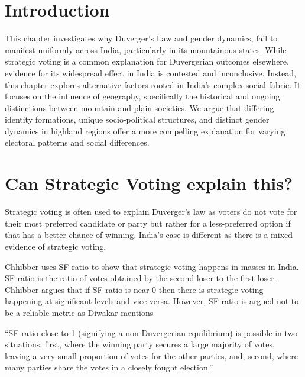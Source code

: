 \section{Introduction}

This chapter investigates why Duverger’s Law and gender dynamics, fail to manifest uniformly across India, particularly in its mountainous states. While strategic voting is a common explanation for Duvergerian outcomes elsewhere, evidence for its widespread effect in India is contested and inconclusive. Instead, this chapter explores alternative factors rooted in India’s complex social fabric. It focuses on the  influence of geography, specifically the historical and ongoing distinctions between mountain and plain societies. We argue that differing identity formations, unique socio-political structures, and distinct gender dynamics in highland regions offer a more compelling explanation for varying electoral patterns and social differences.


\section{Can Strategic Voting explain this?}

Strategic voting is often used to explain Duverger’s law as voters do not vote for their most preferred candidate or party but rather for a less-preferred option if that has a better chance of winning. India’s case is different as there is a mixed evidence of strategic voting. 

\vspace{0.3cm}

Chhibber uses SF ratio to show that strategic voting happens in masses in India. SF ratio is the ratio of votes obtained by the second loser to the first loser. Chhibber argues that if SF ratio is near 0 then there is strategic voting happening at significant levels and vice versa. However, SF ratio is argued not to be a reliable metric as Diwakar mentions 

\vspace{0.3cm}

“SF ratio close to 1 (signifying a non-Duvergerian equilibrium) is possible in two situations: first, where the winning party secures a large majority of votes, leaving a very small proportion of votes for the other parties, and, second, where many parties share the votes in a closely fought election.”

\vspace{0.3cm}

